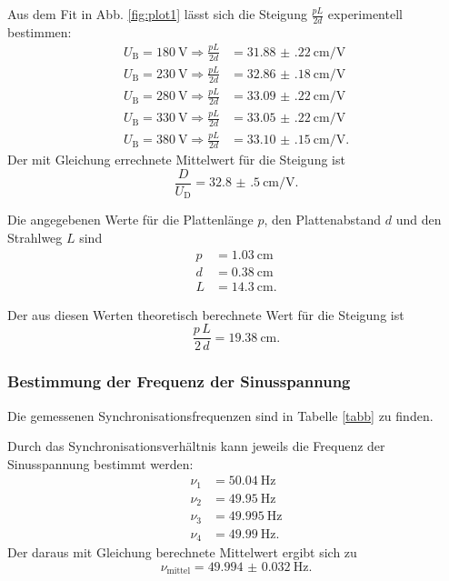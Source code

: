 \noindent Aus dem Fit in Abb. \ref{fig:plot1} lässt sich die Steigung  
$\frac{p L}{2 d}$ experimentell bestimmen:
\begin{align*} 
   U_\text{B} = \SI{180}{\volt} \Rightarrow \frac{p L}{2 d} &= \SI{31.88(22)}{\centi\meter\per\volt} \\
    U_\text{B} = \SI{230}{\volt} \Rightarrow \frac{p L}{2 d} &= \SI{32.86(18)}{\centi\meter\per\volt} \\
    U_\text{B} = \SI{280}{\volt} \Rightarrow \frac{p L}{2 d} &= \SI{33.09(22)}{\centi\meter\per\volt} \\
    U_\text{B} = \SI{330}{\volt} \Rightarrow \frac{p L}{2 d} &= \SI{33.05(22)}{\centi\meter\per\volt} \\
    U_\text{B} = \SI{380}{\volt} \Rightarrow \frac{p L}{2 d} &= \SI{33.10(15)}{\centi\meter\per\volt}.
\end{align*} %
Der mit Gleichung %
errechnete Mittelwert für die Steigung ist
\begin{equation*}
    \frac{D}{U_\text{D}} = \SI{32.8(5)}{\centi\meter\per\volt}.
\end{equation*}

\noindent Die angegebenen Werte für die Plattenlänge $p$,
den Plattenabstand $d$ und den Strahlweg $L$ sind
\begin{align*}
    p &= \SI{1.03}{\centi\meter} \\
    d &= \SI{0.38}{\centi\meter} \\
    L &= \SI{14.3}{\centi\meter}.
\end{align*}

Der aus diesen Werten theoretisch berechnete Wert für die
Steigung ist
\begin{equation*}
    \frac{p \, L}{2 \, d} = \SI{19.38}{\centi\meter}.
\end{equation*}

\subsubsection{Bestimmung der Frequenz der Sinusspannung}
Die gemessenen Synchronisationsfrequenzen sind in Tabelle
\ref{tabb} zu finden. 


\noindent Durch das Synchronisationsverhältnis
kann jeweils die Frequenz der Sinusspannung bestimmt werden:
\begin{align*}
    \nu_1 &= \SI{50.04}{\hertz} \\
    \nu_2 &= \SI{49.95}{\hertz} \\
    \nu_3 &= \SI{49.995}{\hertz} \\
    \nu_4 &= \SI{49.99}{\hertz}.
\end{align*}
Der daraus mit Gleichung
berechnete Mittelwert ergibt sich zu
\begin{equation*}
    \nu_\text{mittel} = \SI{49.994(32)}{\hertz}.
\end{equation*}


